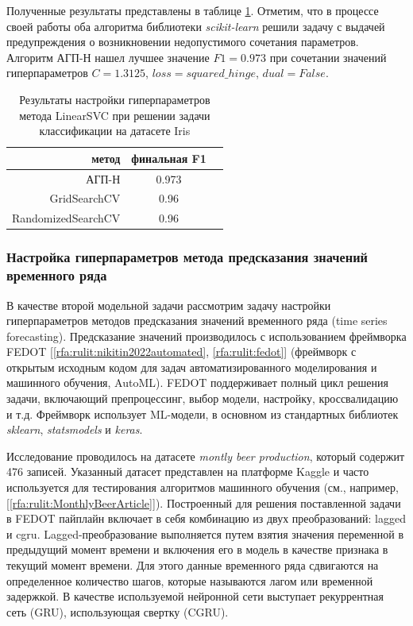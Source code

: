 \documentclass[a4paper,12pt,russian]{article}
\begin{document}
Полученные результаты представлены в таблице \ref{tab22}. Отметим, что в процессе своей работы оба алгоритма библиотеки \textit{scikit-learn} решили задачу с выдачей предупреждения о возникновении недопустимого сочетания параметров. Алгоритм АГП-Н нашел лучшее значение $F1 = 0.973$ при сочетании значений гиперпараметров $C=1.3125$, $loss=squared\_hinge$, $dual = False$.

\begin{table}[h!]
\centering
\caption{Результаты настройки гиперпараметров метода LinearSVC при решении задачи классификации на датасете Iris}\label{tab22}
\begin{tabular}{|r|c|c|}
\hline
метод & финальная F1 \\
\hline \hline
АГП-Н & 0.973 \\
\hline
GridSearchCV & 0.96 \\
\hline
RandomizedSearchCV & 0.96 \\
\hline
\end{tabular}
\end{table}


\subsubsection{Настройка гиперпараметров метода предсказания значений временного ряда }

В качестве второй модельной задачи рассмотрим задачу настройки гиперпараметров методов предсказания значений временного ряда (time series forecasting). Предсказание значений производилось с использованием фреймворка FEDOT [\ref{rfa:rulit:nikitin2022automated}, \ref{rfa:rulit:fedot}]
(фреймворк с открытым исходным кодом для задач автоматизированного моделирования и машинного обучения, AutoML). FEDOT поддерживает полный цикл решения задачи, включающий препроцессинг, выбор модели, настройку, кроссвалидацию и т.д. Фреймворк использует ML-модели, в основном из стандартных библиотек \textit{sklearn}, \textit{statsmodels} и \textit{keras}.

Исследование проводилось на датасете \textit{montly beer production}, который содержит 476 записей. %
Указанный датасет представлен на платформе Kaggle и часто используется для тестирования алгоритмов машинного обучения (см., например, [\ref{rfa:rulit:MonthlyBeerArticle}]).
Построенный для решения поставленной задачи в FEDOT пайплайн включает в себя комбинацию из двух преобразований: lagged и cgru. Lagged-преобразование выполняется путем взятия значения переменной в предыдущий момент времени и включения его в модель в качестве признака в текущий момент времени. Для этого данные временного ряда сдвигаются на определенное количество шагов, которые называются лагом или временной задержкой. В качестве используемой нейронной сети выступает рекуррентная сеть (GRU), использующая свертку (CGRU).
\end{document}
